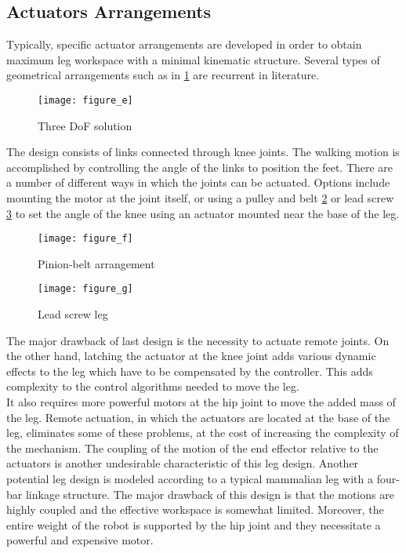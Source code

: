 \subsection{Actuators Arrangements}
Typically, specific actuator arrangements are developed in order to obtain maximum leg workspace with a minimal kinematic structure. Several types of geometrical arrangements such as in \ref{figure_e} are recurrent in literature.

\begin{figure}[h]
	\centering
	\texttt{[image: figure\_e]}
	\caption{Three DoF solution}
	\label{figure_e}
\end{figure}

The design consists of links connected through knee joints. The walking motion is accomplished by controlling the angle of the links to position the feet. There are a number of different ways in which the joints can be actuated. Options include mounting the motor at the joint itself, or using a pulley and belt \ref{figure_f} or lead screw \ref{figure_g} to set the angle of the knee using an actuator mounted near the base of the leg.

\begin{figure}[H]
	\centering
	\texttt{[image: figure\_f]}
	\caption{Pinion-belt arrangement}
	\label{figure_f}
\end{figure}

\begin{figure}[H]
	\centering
	\texttt{[image: figure\_g]}
	\caption{Lead screw leg}
	\label{figure_g}
\end{figure}

The major drawback of last design is the necessity to actuate remote joints. On the other hand, latching the actuator at the knee joint adds various dynamic effects to the leg which have to be compensated by the controller. This adds complexity to the control algorithms needed to move the leg.\\
It also requires more powerful motors at the hip joint to move the added mass of the leg. Remote actuation, in which the actuators are located at the base of the leg, eliminates some of these problems, at the cost of increasing the complexity of the mechanism. The coupling of the motion of the end effector relative to the actuators is another undesirable characteristic of this leg design.  Another potential leg design is modeled according to a typical mammalian leg with a four-bar linkage structure. The major drawback of this design is that the motions are highly coupled and the effective workspace is somewhat limited. Moreover, the entire weight of the robot is supported by the hip joint and they necessitate a powerful and expensive motor.

